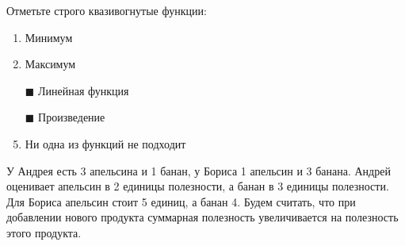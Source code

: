 \task
Отметьте строго квазивогнутые функции:
\begin{enumerate}[label=$\square$]
	
	
	
	
	
	\item Минимум
	\item Максимум
	\item[$\blacksquare$] Линейная функция
	\item[$\blacksquare$] Произведение
	\item Ни одна из функций не подходит
\end{enumerate}

\task
У Андрея есть 3 апельсина и 1 банан, у Бориса 1 апельсин и 3 банана. Андрей оценивает апельсин в 2 единицы полезности, а банан в 3 единицы полезности. Для Бориса апельсин стоит 5 единиц, а банан 4. Будем считать, что при добавлении нового продукта суммарная полезность увеличивается на полезность этого продукта.

